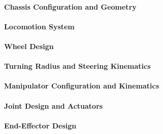 \paragraph{Chassis Configuration and Geometry}
\label{par:chassis_configuration_geometry}


\newpage
\paragraph{Locomotion System}
\label{par:locomotion_system}


\paragraph{Wheel Design}
\label{par:wheel_design}


\paragraph{Turning Radius and Steering Kinematics}
\label{par:turning_radius_steering_kinematics}


\paragraph{Manipulator Configuration and Kinematics}
\label{par:manipulator_configuration_kinematics}


\paragraph{Joint Design and Actuators}
\label{par:joint_design_actuators}


\paragraph{End-Effector Design}
\label{par:end_effector_design}


